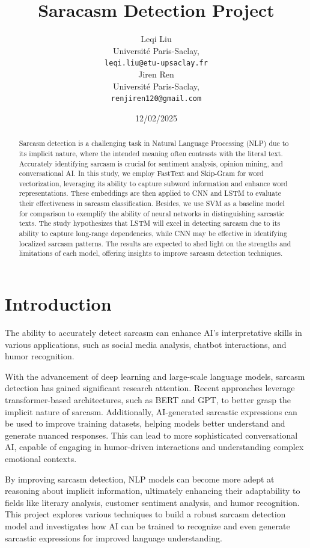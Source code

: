 \documentclass[11pt]{article}
\title{Saracasm Detection Project}
\author{Leqi Liu \\
  Université Paris-Saclay, \\
  {\tt leqi.liu@etu-upsaclay.fr} \\\And
    Jiren Ren \\
   Université Paris-Saclay, \\
  {\tt renjiren120@gmail.com} \\}
\date{12/02/2025}
\begin{document}
\maketitle
\begin{abstract}
Sarcasm detection is a challenging task in Natural Language Processing (NLP) due to its implicit nature, where the intended meaning often contrasts with the literal text. Accurately identifying sarcasm is crucial for sentiment analysis, opinion mining, and conversational AI. In this study, we employ FastText and Skip-Gram for word vectorization, leveraging its ability to capture subword information and enhance word representations. These embeddings are then applied to CNN and LSTM to evaluate their effectiveness in sarcasm classification. Besides, we use SVM as a baseline model for comparison to exemplify the ability of neural networks in distinguishing sarcastic texts. The study hypothesizes that LSTM will excel in detecting sarcasm due to its ability to capture long-range dependencies, while CNN may be effective in identifying localized sarcasm patterns. The results are expected to shed light on the strengths and limitations of each model, offering insights to improve sarcasm detection techniques.
\end{abstract}

\section{Introduction}
The ability to accurately detect sarcasm can enhance AI's interpretative skills in various applications, such as social media analysis, chatbot interactions, and humor recognition.

With the advancement of deep learning and large-scale language models, sarcasm detection has gained significant research attention. Recent approaches leverage transformer-based architectures, such as BERT and GPT, to better grasp the implicit nature of sarcasm. Additionally, AI-generated sarcastic expressions can be used to improve training datasets, helping models better understand and generate nuanced responses. This can lead to more sophisticated conversational AI, capable of engaging in humor-driven interactions and understanding complex emotional contexts.

By improving sarcasm detection, NLP models can become more adept at reasoning about implicit information, ultimately enhancing their adaptability to fields like literary analysis, customer sentiment analysis, and humor recognition. This project explores various techniques to build a robust sarcasm detection model and investigates how AI can be trained to recognize and even generate sarcastic expressions for improved language understanding.
\end{document}
